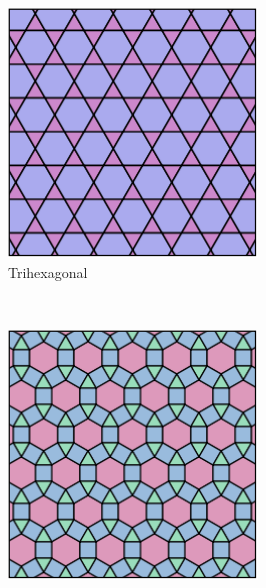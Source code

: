 \documentclass[]{article}
\begin{document}
\begin{figure}
        \centering
        \begin{subfigure}[hb]{0.3\textwidth}
                \includegraphics[width=\textwidth]{trihexagon}
                \caption{Trihexagonal }
                \label{fig:trihex}
        \end{subfigure}%
        ~ %
        \begin{subfigure}[hb]{0.3\textwidth}
                \includegraphics[width=\textwidth]{rhombitrihexagon}

\end{subfigure}
\end{figure}
\end{document}
